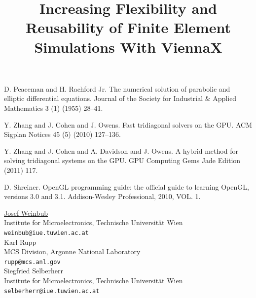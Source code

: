 \documentclass[article,A4,11pt]{llncs}%
\begin{document}

\begin{thebibliography}{10}
{\sc D. Peaceman and H. Rachford Jr}. {The numerical solution of parabolic and elliptic differential equations}. Journal of the Society for Industrial \& Applied Mathematics 3 (1) (1955) 28–41.

{\sc Y. Zhang and J. Cohen and J. Owens}. {Fast tridiagonal solvers on the GPU}. ACM Sigplan Notices 45 (5) (2010) 127–136.

{\sc Y. Zhang and J. Cohen and A. Davidson and J. Owens}. {A hybrid method for solving tridiagonal systems on the GPU}. GPU Computing Gems Jade Edition (2011) 117.

{\sc D. Shreiner}. {OpenGL programming guide: the official guide to learning OpenGL, versions 3.0 and 3.1}. Addison-Wesley Professional, 2010, VOL. 1.
\end{thebibliography}

\title{Increasing Flexibility and Reusability of Finite Element Simulations With ViennaX}
 \author{} \institute{}
\maketitle
\begin{center}
{\large \underline{Josef Weinbub}}\\
Institute for Microelectronics, Technische Universität Wien\\
{\tt weinbub@iue.tuwien.ac.at}
\\ \vspace{4mm}
{\large Karl Rupp}\\
MCS Division, Argonne National Laboratory\\
{\tt rupp@mcs.anl.gov}
\\ \vspace{4mm}
{\large Siegfried Selberherr}\\
Institute for Microelectronics, Technische Universität Wien\\
{\tt selberherr@iue.tuwien.ac.at}
\end{center}
\end{document}
